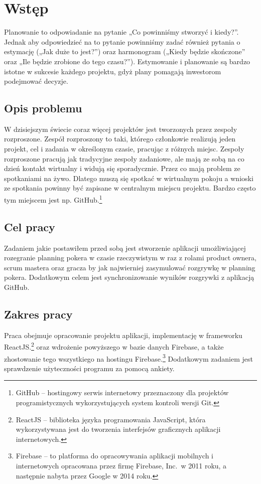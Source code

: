 ﻿\chapter*{Wstęp}
Planowanie to odpowiadanie na pytanie „Co powinniśmy stworzyć i kiedy?”.
Jednak aby odpowiedzieć na to pytanie powinniśmy zadać również pytania o estymację
(„Jak duże to jest?”) oraz harmonogram („Kiedy będzie skończone” oraz „Ile będzie zrobione do tego czasu?”).
Estymowanie i planowanie są bardzo istotne w sukcesie każdego projektu,
gdyż plany pomagają inwestorom podejmować decyzje.\cite{Cohen_2006}
\section*{Opis problemu}

W dzisiejszym świecie coraz więcej projektów jest tworzonych przez zespoły rozproszone.
Zespół rozproszony to taki, którego członkowie realizują jeden projekt,
cel i zadania w określonym czasie, pracując z różnych miejsc. 
Zespoły rozproszone pracują jak tradycyjne zespoły zadaniowe,
ale mają ze sobą na co dzień kontakt wirtualny i widują się sporadycznie.\cite{www_rozproszony}
Przez co mają problem ze spotkaniami na żywo.
Dlatego muszą się spotkać w wirtualnym pokoju a wnioski ze spotkania powinny być zapisane w centralnym miejscu projektu.
Bardzo często tym miejscem jest np. GitHub.\footnote{GitHub – hostingowy serwis internetowy przeznaczony dla projektów programistycznych wykorzystujących system kontroli wersji Git.}

\section*{Cel pracy}

Zadaniem jakie postawiłem przed sobą jest stworzenie aplikacji umożliwiającej rozegranie planning pokera w czasie rzeczywistym w raz z rolami product ownera,
scrum mastera oraz gracza by jak najwierniej zasymulować rozgrywkę w planning pokera.
Dodatkowym celem jest synchronizowanie wyników rozgrywki z aplikacją GitHub.

\section*{Zakres pracy}

Praca obejmuje opracowanie projektu aplikacji, implementację w frameworku ReactJS.\footnote{ReactJS – biblioteka języka programowania JavaScript, która wykorzystywana jest do tworzenia interfejsów graficznych aplikacji internetowych.}
oraz wdrożenie powyższego w bazie danych Firebase, a także zhostowanie tego wszystkiego na hostingu Firebase.\footnote{Firebase – to platforma do opracowywania aplikacji mobilnych i internetowych opracowana przez firmę Firebase, Inc.\ w 2011 roku, a następnie nabyta przez Google w 2014 roku.}
Dodatkowym zadaniem jest sprawdzenie użyteczności programu za pomocą ankiety.